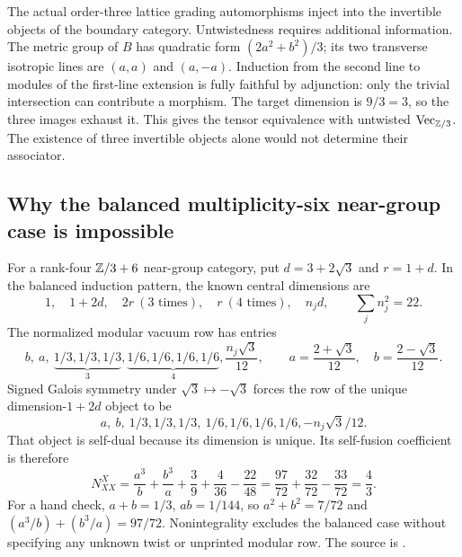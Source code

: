 The actual order-three lattice grading automorphisms inject into
the invertible objects of the boundary category. Untwistedness
requires additional information. The metric group of $B$ has
quadratic form $(2a^2+b^2)/3$; its two transverse isotropic lines
are $(a,a)$ and $(a,-a)$. Induction from the second line to modules
of the first-line extension is fully faithful by adjunction:
only the trivial intersection can contribute a morphism.
The target dimension is $9/3=3$, so the three images exhaust it.
This gives the tensor equivalence with untwisted
$\mathrm{Vec}_{\mathbb Z/3}$. The existence of three invertible objects alone
would not determine their associator.

\subsection{Why the balanced multiplicity-six near-group case is impossible}

For a rank-four $\mathbb Z/3+6$ near-group category, put
$d=3+2\sqrt3$ and $r=1+d$. In the balanced induction pattern,
the known central dimensions are
\[
 1,\quad 1+2d,\quad 2r\ (3\text{ times}),
 \quad r\ (4\text{ times}),\quad n_jd,
 \qquad \sum_jn_j^2=22.
\]
The normalized modular vacuum row has entries
\[
 b,\ a,\ \underbrace{1/3,1/3,1/3}_{3},
 \underbrace{1/6,1/6,1/6,1/6}_{4},
 \frac{n_j\sqrt3}{12},
 \qquad
 a=\frac{2+\sqrt3}{12},\quad b=\frac{2-\sqrt3}{12}.
\]
Signed Galois symmetry under $\sqrt3\mapsto-\sqrt3$ forces the
row of the unique dimension-$1+2d$ object to be
\[
 a,\ b,\ 1/3,1/3,1/3,\ 1/6,1/6,1/6,1/6,
 -n_j\sqrt3/12.
\]
That object is self-dual because its dimension is unique. Its
self-fusion coefficient is therefore
\[
 N_{XX}^{X}
 =\frac{a^3}{b}+\frac{b^3}{a}+\frac{3}{9}
        +\frac4{36}-\frac{22}{48}
 =\frac{97}{72}+\frac{32}{72}-\frac{33}{72}
 =\frac43.
\]
For a hand check, $a+b=1/3$, $ab=1/144$, so
$a^2+b^2=7/72$ and
$(a^3/b)+(b^3/a)=97/72$. Nonintegrality excludes the balanced
case without specifying any unknown twist or unprinted modular
row. The source is
.

